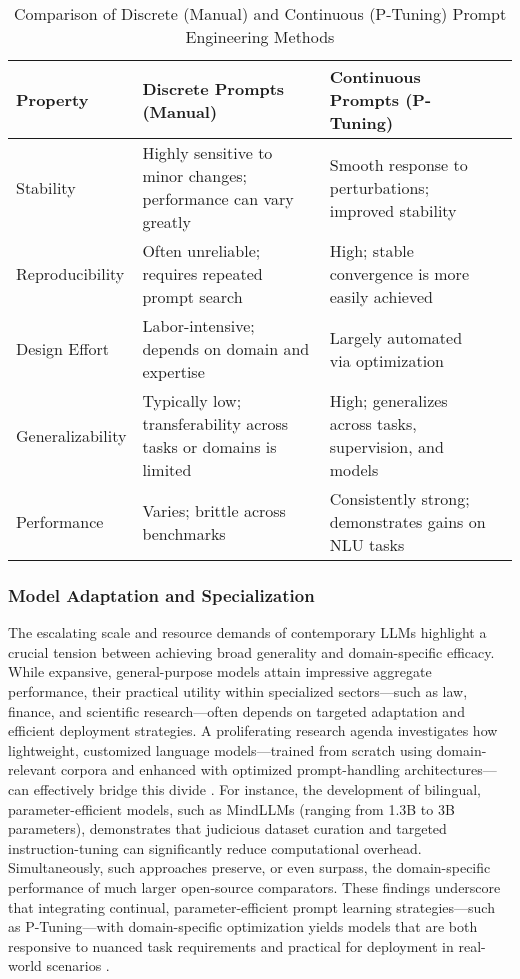 \begin{table*}[htbp]
\centering
\caption{Comparison of Discrete (Manual) and Continuous (P-Tuning) Prompt Engineering Methods}
\label{tab:prompt_comparison}
\begin{adjustbox}{max width=\textwidth}
\begin{tabular}{@{}llll@{}}
\toprule
\textbf{Property} & \textbf{Discrete Prompts (Manual)} & \textbf{Continuous Prompts (P-Tuning)} & \\
\midrule
Stability & Highly sensitive to minor changes; performance can vary greatly & Smooth response to perturbations; improved stability & \\
Reproducibility & Often unreliable; requires repeated prompt search & High; stable convergence is more easily achieved & \\
Design Effort & Labor-intensive; depends on domain and expertise & Largely automated via optimization & \\
Generalizability & Typically low; transferability across tasks or domains is limited & High; generalizes across tasks, supervision, and models & \\
Performance & Varies; brittle across benchmarks & Consistently strong; demonstrates gains on NLU tasks & \\
\bottomrule
\end{tabular}
\end{adjustbox}
\end{table*}

\subsubsection{Model Adaptation and Specialization}

The escalating scale and resource demands of contemporary LLMs highlight a crucial tension between achieving broad generality and domain-specific efficacy. While expansive, general-purpose models attain impressive aggregate performance, their practical utility within specialized sectors---such as law, finance, and scientific research---often depends on targeted adaptation and efficient deployment strategies. A proliferating research agenda investigates how lightweight, customized language models---trained from scratch using domain-relevant corpora and enhanced with optimized prompt-handling architectures---can effectively bridge this divide \cite{ref104}. For instance, the development of bilingual, parameter-efficient models, such as MindLLMs (ranging from 1.3B to 3B parameters), demonstrates that judicious dataset curation and targeted instruction-tuning can significantly reduce computational overhead. Simultaneously, such approaches preserve, or even surpass, the domain-specific performance of much larger open-source comparators. These findings underscore that integrating continual, parameter-efficient prompt learning strategies---such as P-Tuning---with domain-specific optimization yields models that are both responsive to nuanced task requirements and practical for deployment in real-world scenarios \cite{ref103}\cite{ref104}.

